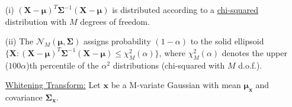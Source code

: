 \documentclass[fleqn]{article}
\begin{document}
	\begin{enumerate}
		\item[(i)] $(\mathbf{X} - \boldsymbol{\mu})^T\mathbf{\Sigma}^{-1}(\mathbf{X} - \boldsymbol{\mu})$ is distributed according to a \underline{chi-squared} distribution with $M$ degrees of freedom.
		
		\item[(ii)] The $\mathcal{N}_M(\boldsymbol{\mu}, \mathbf{\Sigma})$ assigns probability $(1 - \alpha)$ to the solid ellipsoid \newline $\{\mathbf{X}: (\mathbf{X} - \boldsymbol{\mu})^T\mathbf{\Sigma}^{-1}(\mathbf{X} - \boldsymbol{\mu}) \leq \chi_M^2(\alpha)\}$, where $\chi_M^2(\alpha)$ denotes the upper ($100\alpha$)th percentile of the $\alpha^2$ distributions (chi-squared with $M$ d.o.f.).
		
		\underline{Whitening Transform:} Let $\mathbf{x}$ be a M-variate Gaussian with mean $\mathbf{\boldsymbol{\mu}_x}$ and covariance $\mathbf{\Sigma_x}$.
		
	\end{enumerate}
\end{document}
